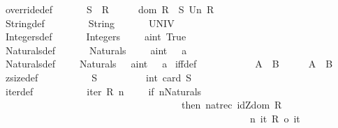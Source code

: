 \begin{isabellebody}
override{\isacharunderscore}def{\isacharcolon}\ \ \ \ \ \ \ {\isachardoublequoteopen}S\ {\isacharparenleft}{\isacharplus}{\isacharparenright}\ R\ \ \ \ \ {\isacharequal}{\isacharequal}\ {\isacharparenleft}dom\ R\ {\isacharless}{\isacharminus}{\isacharcolon}\ S{\isacharparenright}\ Un\ R{\isachardoublequoteclose}\isanewline
\isanewline
String{\isacharunderscore}def{\isacharcolon}\ \ \ \ \ \ \ \ \ {\isachardoublequoteopen}String\ \ \ \ \ \ {\isacharequal}{\isacharequal}\ UNIV{\isachardoublequoteclose}\isanewline
Integers{\isacharunderscore}def{\isacharcolon}\ \ \ \ \ \ \ {\isachardoublequoteopen}Integers\ \ \ \ {\isacharequal}{\isacharequal}\ {\isacharbraceleft}a{\isacharcolon}{\isacharcolon}int{\isachardot}\ True{\isacharbraceright}{\isachardoublequoteclose}\isanewline
Naturals{\isacharunderscore}def{\isacharcolon}\ \ \ \ \ \ \ {\isachardoublequoteopen}Naturals\ \ \ \ {\isacharequal}{\isacharequal}\ {\isacharbraceleft}a{\isacharcolon}{\isacharcolon}int{\isachardot}\ {}\ {\isacharless}{\isacharequal}\ a\ {\isacharbraceright}{\isachardoublequoteclose}\isanewline
Naturals{\isacharunderscore}{}{\isacharunderscore}def{\isacharcolon}\ \ \ \ \ {\isachardoublequoteopen}Naturals{\isacharunderscore}{}\ \ {\isacharequal}{\isacharequal}\ {\isacharbraceleft}a{\isacharcolon}{\isacharcolon}int{\isachardot}\ {}\ {\isacharless}{\isacharequal}\ a\ {\isacharbraceright}{\isachardoublequoteclose}\isanewline
\isanewline
\isanewline
iff{\isacharunderscore}def{\isacharcolon}\ \ \ \ \ \ \ \ \ \ \ \ {\isachardoublequoteopen}A\ {\isacharless}{\isacharminus}{\isachargreater}\ B\ \ \ \ \ {\isacharequal}{\isacharequal}\ A\ {\isacharequal}\ B{\isachardoublequoteclose}\isanewline
\isanewline
zsize{\isacharunderscore}def{\isacharcolon}\ \ \ \ \ \ \ \ \ \ {\isachardoublequoteopen}{\isacharhash}\ S\ \ \ \ \ \ \ \ \ {\isacharequal}{\isacharequal}\ int\ {\isacharparenleft}card\ S{\isacharparenright}{\isachardoublequoteclose}\isanewline
\isanewline
iter{\isacharunderscore}def{\isacharcolon}\ \ \ \ \ \ \ \ \ \ \ {\isachardoublequoteopen}iter\ R\ n\ \ \ \ {\isacharequal}{\isacharequal}\ if\ {\isacharparenleft}n{\isacharcolon}Naturals{\isacharparenright}\ \isanewline
\ \ \ \ \ \ \ \ \ \ \ \ \ \ \ \ \ \ \ \ \ \ \ \ \ \ \ \ \ \ \ \ \ \ \ \ then\ {\isacharparenleft}nat{\isacharunderscore}rec\ {\isacharparenleft}idZ{\isacharparenleft}dom\ R{\isacharparenright}{\isacharparenright}\ \isanewline
\ \ \ \ \ \ \ \ \ \ \ \ \ \ \ \ \ \ \ \ \ \ \ \ \ \ \ \ \ \ \ \ \ \ \ \ \ \ \ \ \ \ \ \ \ \ \ \ \ \ {\isacharparenleft}{\isacharpercent}n\ it{\isachardot}\ R\ {\isacharpercent}o\ it{\isacharparenright}\ \isanewline

\end{isabellebody}
